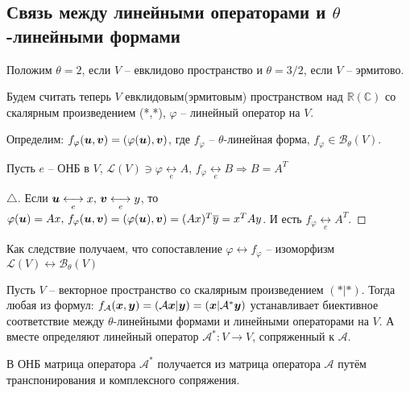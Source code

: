 \subsection{Связь между линейными операторами и $\theta$-линейными формами}

Положим $\theta = 2$, если $V$ -- евклидово пространство и $\theta=3/2$, если $V$ -- эрмитово.

Будем считать теперь $V$ евклидовым(эрмитовым) пространством над $\mathbb{R}(\mathbb{C})$ со скалярным произведением (*,*), $\varphi$ -- линейный оператор на $V$.

Определим: $f_\varphi (\mbox{\boldmath $u$}, \mbox{\boldmath $v$}) = (\varphi(\mbox{\boldmath $u$}), \mbox{\boldmath $v$})$, где $f_\varphi$ -- $\theta$-линейная форма, $f_\varphi \in \mathcal{B}_\theta (V)$.

\begin{to_lem} 
	 Пусть $e$ -- ОНБ в $V$, $\mathcal{L}(V) \ni \varphi \underset{e}{\longleftrightarrow} A, \, f_\varphi \underset{e}{\longleftrightarrow} B \Longrightarrow B = A^T$
\end{to_lem}

\begin{proof}[$\triangle$]
	Если $\mbox{\boldmath $u$} \underset{e}{\longleftrightarrow} x, \, \mbox{\boldmath $v$} \underset{e}{\longleftrightarrow} y$, то 
	$\varphi (\mbox{\boldmath $u$}) = A x, \, f_\varphi(\mbox{\boldmath $u$},\mbox{\boldmath $v$}) = (\varphi(\mbox{\boldmath $u$}),\mbox{\boldmath $v$}) = (A x)^T \overline{y} = x^T A y$. И есть $f_\varphi \underset{e}{\longleftrightarrow} A^T$.
\end{proof}

Как следствие получаем, что сопоставление $\varphi \longleftrightarrow f_\varphi$ -- изоморфизм $\mathcal{L}(V) \longleftrightarrow \mathcal{B}_\theta(V)$


\begin{to_thr} 
	Пусть $V$ -- векторное пространство со скалярным произведением $(*|*)$. Тогда любая из формул: $f_\mathcal{A} (\mbox{\boldmath $x$},\mbox{\boldmath $y$}) =(\mathcal{A} \mbox{\boldmath $x$} | \mbox{\boldmath $y$}) = (\mbox{\boldmath $x$}|\mathcal{A}^* \mbox{\boldmath $y$})$ устанавливает биективное соответствие между $\theta$-линейными формами и линейными операторами на $V$. А вместе определяют линейный оператор $\mathcal{A}^* \colon V \to V$, сопряженный к $\mathcal{A}$.

	В ОНБ матрица оператора $\mathcal{A}^*$ получается из матрица оператора $\mathcal{A}$ путём транспонирования и комплексного сопряжения.
\end{to_thr}

